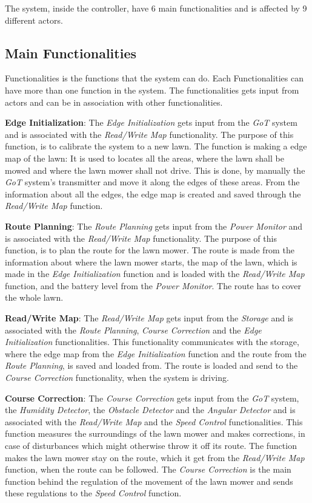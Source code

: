 \noindent
\newpage

The system, inside the controller, have 6 main functionalities and is affected by 9 different actors.

\subsection{Main Functionalities}

Functionalities is the functions that the system can do. Each Functionalities can have more than one function in the system. The functionalities gets input from actors and can be in association with other functionalities. 

\textbf{Edge Initialization}:
The \textit{Edge Initialization} gets input from the \textit{GoT} system and is associated with the \textit{Read/Write Map} functionality. The purpose of this function, is to calibrate the system to a new lawn. The function is making a edge map of the lawn: It is used to locates all the areas, where the lawn shall be mowed and where the lawn mower shall not drive. This is done, by manually the \textit{GoT} system's transmitter and move it along the edges of these areas. From the information about all the edges, the edge map is created and saved through the \textit{Read/Write Map} function.

\textbf{Route Planning}:
The \textit{Route Planning} gets input from the \textit{Power Monitor} and is associated with the \textit{Read/Write Map} functionality. The purpose of this function, is to plan the route for the lawn mower. The route is made from the information about where the lawn mower starts, the map of the lawn, which is made in the \textit{Edge Initialization} function and is loaded with the \textit{Read/Write Map} function, and the battery level from the \textit{Power Monitor}. The route has to cover the whole lawn.

\textbf{Read/Write Map}:
The \textit{Read/Write Map} gets input from the \textit{Storage} and is associated with the \textit{Route Planning}, \textit{Course Correction} and the \textit{Edge Initialization} functionalities. This functionality communicates with the storage, where the edge map from the \textit{Edge Initialization} function and the route from the \textit{Route Planning}, is saved and loaded from. The route is loaded and send to the \textit{Course Correction} functionality, when the system is driving.

\textbf{Course Correction}:
The \textit{Course Correction} gets input from the \textit{GoT} system, the \textit{Humidity Detector}, the \textit{Obstacle Detector} and the \textit{Angular Detector} and is associated with the \textit{Read/Write Map} and the \textit{Speed Control} functionalities. This function measures the surroundings of the lawn mower and makes corrections, in case of disturbances which might otherwise throw it off its route. The function makes the lawn mower stay on the route, which it get from the \textit{Read/Write Map} function, when the route can be followed. The \textit{Course Correction} is the main function behind the regulation of the movement of the lawn mower and sends these regulations to the \textit{Speed Control} function.

